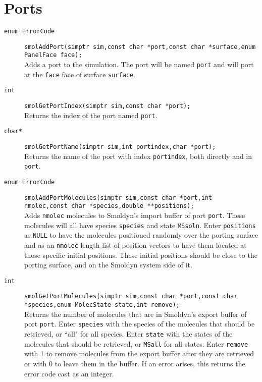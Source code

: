 \documentclass {book}
\begin{document}
\section{Ports}

\begin{description}

\item[\texttt{enum ErrorCode}]
\texttt{smolAddPort(simptr sim,const char *port,const char *surface,enum PanelFace face);}
\hfill \\
Adds a port to the simulation.  The port will be named \texttt{port} and will port at the \texttt{face} face of surface \texttt{surface}.

\item[\texttt{int}]
\texttt{smolGetPortIndex(simptr sim,const char *port);}
\hfill \\
Returns the index of the port named \texttt{port}.

\item[\texttt{char*}]
\texttt{smolGetPortName(simptr sim,int portindex,char *port);}
\hfill \\
Returns the name of the port with index \texttt{portindex}, both directly and in \texttt{port}.

\item[\texttt{enum ErrorCode}]
\texttt{smolAddPortMolecules(simptr sim,const char *port,int nmolec,const char *species,double **positions);}
\hfill \\
Adds \texttt{nmolec} molecules to Smoldyn's import buffer of port \texttt{port}.  These molecules will all have species \texttt{species} and state \texttt{MSsoln}.  Enter \texttt{positions} as \texttt{NULL} to have the molecules positioned randomly over the porting surface and as an \texttt{nmolec} length list of position vectors to have them located at those specific initial positions.  These initial positions should be close to the porting surface, and on the Smoldyn system side of it.

\item[\texttt{int}]
\texttt{smolGetPortMolecules(simptr sim,const char *port,const char *species,enum MolecState state,int remove);}
\hfill \\
Returns the number of molecules that are in Smoldyn's export buffer of port \texttt{port}.  Enter \texttt{species} with the species of the molecules that should be retrieved, or ``all" for all species.  Enter \texttt{state} with the states of the molecules that should be retrieved, or \texttt{MSall} for all states.  Enter \texttt{remove} with 1 to remove molecules from the export buffer after they are retrieved or with 0 to leave them in the buffer.  If an error arises, this returns the error code cast as an integer.

\end{description}
\end{document}
